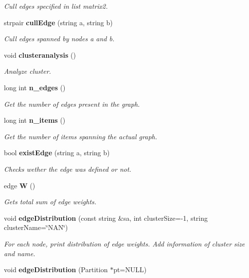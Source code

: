 \begin{CompactItemize}
\begin{CompactList}\small\item\em Cull edges specified in list matrix2. \item\end{CompactList}\item 
strpair {\bf cull\-Edge} (string a, string b)\label{classMatrixOfValues_a21}

\begin{CompactList}\small\item\em Cull edges spanned by nodes a and b. \item\end{CompactList}\item 
void {\bf clusteranalysis} ()\label{classMatrixOfValues_a22}

\begin{CompactList}\small\item\em Analyze cluster. \item\end{CompactList}\item 
long int {\bf n\_\-edges} ()\label{classMatrixOfValues_a23}

\begin{CompactList}\small\item\em Get the number of edges present in the graph. \item\end{CompactList}\item 
long int {\bf n\_\-items} ()\label{classMatrixOfValues_a24}

\begin{CompactList}\small\item\em Get the number of items spanning the actual graph. \item\end{CompactList}\item 
bool {\bf exist\-Edge} (string a, string b)\label{classMatrixOfValues_a25}

\begin{CompactList}\small\item\em Checks wether the edge was defined or not. \item\end{CompactList}\item 
edge {\bf W} ()\label{classMatrixOfValues_a26}

\begin{CompactList}\small\item\em Gets total sum of edge weights. \item\end{CompactList}\item 
void {\bf edge\-Distribution} (const string \&sa, int cluster\-Size=-1, string cluster\-Name=\char`\"{}NAN\char`\"{})
\begin{CompactList}\small\item\em For each node, print distribution of edge weights. Add information of cluster size and name. \item\end{CompactList}\item 
void {\bf edge\-Distribution} (Partition $\ast$pt=NULL)\label{classMatrixOfValues_a28}


\end{CompactItemize}
